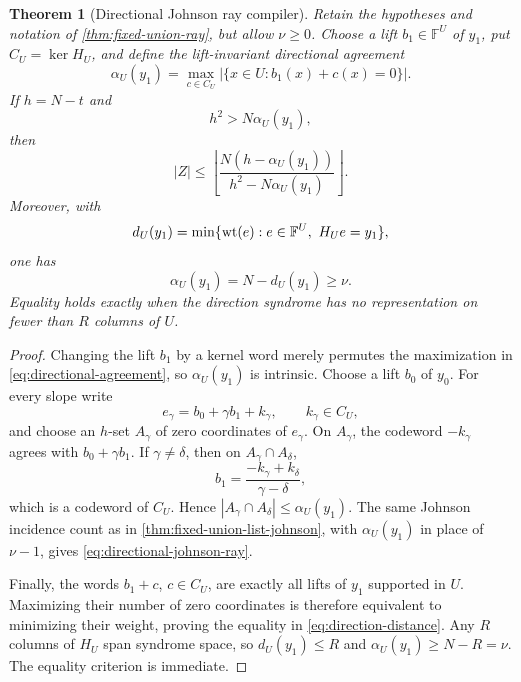\documentclass[11pt,a4paper]{amsart}
\numberwithin{equation}{section}
\newtheorem{theorem}{Theorem}[section]
\theoremstyle{remark}
\newcommand{\F}{\mathbb F}\newcommand{\B}{\mathbb B}\newcommand{\K}{\mathbb K}\newcommand{\Z}{\mathbb Z}
\begin{document}
\begin{theorem}[Directional Johnson ray compiler]
\label{thm:directional-johnson-ray}
Retain the hypotheses and notation of \cref{thm:fixed-union-ray}, but allow
\(\nu\ge0\).  Choose a lift \(b_1\in\F^U\) of \(y_1\), put
\(C_U=\ker H_U\), and define the lift-invariant directional agreement
\begin{equation}
 \alpha_U(y_1)=
 \max_{c\in C_U}|\{x\in U:b_1(x)+c(x)=0\}|.
 \label{eq:directional-agreement}
\end{equation}
If \(h=N-t\) and
\begin{equation}
 h^2>N\alpha_U(y_1),                                \label{eq:directional-johnson-condition}
\end{equation}
then
\begin{equation}
 |Z|\le
 \left\lfloor
 \frac{N(h-\alpha_U(y_1))}
 {h^2-N\alpha_U(y_1)}
 \right\rfloor .                                  \label{eq:directional-johnson-ray}
\end{equation}
Moreover, with
\[
 d_U(y_1)=\min\{\wt(e):e\in\F^U,\ H_Ue=y_1\},
\]
one has
\begin{equation}
 \alpha_U(y_1)=N-d_U(y_1)\ge\nu.                  \label{eq:direction-distance}
\end{equation}
Equality holds exactly when the direction syndrome has no representation
on fewer than \(R\) columns of \(U\).
\end{theorem}

\begin{proof}
Changing the lift \(b_1\) by a kernel word merely permutes the maximization
in \eqref{eq:directional-agreement}, so \(\alpha_U(y_1)\) is intrinsic.
Choose a lift \(b_0\) of \(y_0\).  For every slope write
\[
 e_\gamma=b_0+\gamma b_1+k_\gamma,
 \qquad k_\gamma\in C_U,
\]
and choose an \(h\)-set \(A_\gamma\) of zero coordinates of
\(e_\gamma\).  On \(A_\gamma\), the codeword \(-k_\gamma\) agrees with
\(b_0+\gamma b_1\).  If \(\gamma\ne\delta\), then on
\(A_\gamma\cap A_\delta\),
\[
 b_1=\frac{-k_\gamma+k_\delta}{\gamma-\delta},
\]
which is a codeword of \(C_U\).  Hence
\(|A_\gamma\cap A_\delta|\le\alpha_U(y_1)\).  The same Johnson
incidence count as in \cref{thm:fixed-union-list-johnson}, with
\(\alpha_U(y_1)\) in place of \(\nu-1\), gives
\eqref{eq:directional-johnson-ray}.

Finally, the words \(b_1+c\), \(c\in C_U\), are exactly all lifts of
\(y_1\) supported in \(U\).  Maximizing their number of zero coordinates
is therefore equivalent to minimizing their weight, proving the equality
in \eqref{eq:direction-distance}.  Any \(R\) columns of \(H_U\) span
syndrome space, so \(d_U(y_1)\le R\) and \(\alpha_U(y_1)\ge N-R=\nu\).
The equality criterion is immediate.
\end{proof}
\end{document}
